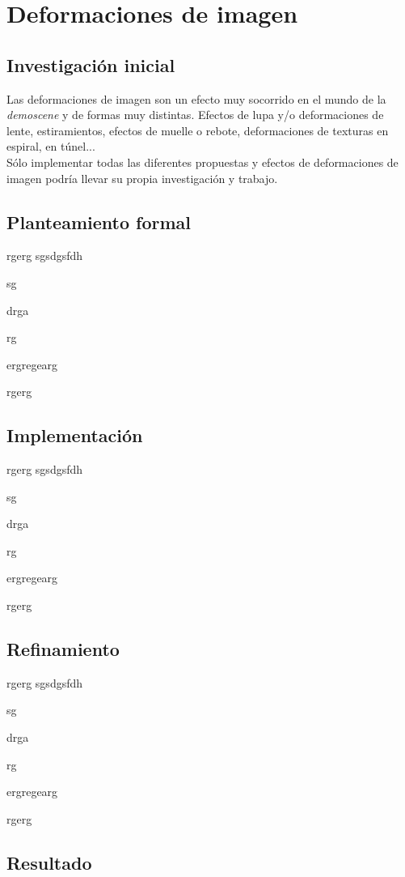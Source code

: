 \section{Deformaciones de imagen}

\subsection{Investigación inicial}

Las deformaciones de imagen son un efecto muy socorrido en el mundo de la \emph{demoscene} y de formas muy distintas. Efectos de lupa y/o deformaciones de lente, estiramientos, efectos de muelle o rebote, deformaciones de texturas en espiral, en túnel...\\

Sólo implementar todas las diferentes propuestas y efectos de deformaciones de imagen podría llevar su propia investigación y trabajo. 

\subsection{Planteamiento formal}

rgerg
sgsdgsfdh

sg

drga

rg

ergregearg

rgerg

\subsection{Implementación}

rgerg
sgsdgsfdh

sg

drga

rg

ergregearg

rgerg

\subsection{Refinamiento}

rgerg
sgsdgsfdh

sg

drga

rg

ergregearg

rgerg

\subsection{Resultado}

